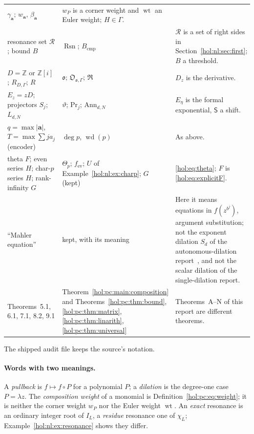 \documentclass[11pt]{article}
\numberwithin{equation}{section}
\theoremstyle{definition}
\theoremstyle{remark}
\newcommand{\Z}{\mathbb Z}
\newcommand{\abs}[1]{\lvert#1\rvert}
\newcommand{\wt}{\operatorname{wt}}
\begin{document}
{\begin{longtable}{@{}>{\raggedright\arraybackslash}p{}
>{\raggedright\arraybackslash}p{}
>{\raggedright\arraybackslash}p{}@{}}
$\gamma_{\mathbf a}$; $w_{\mathbf a}$, $\beta_{\mathbf a}$ & $w_P$ is a corner
weight and $\wt$ an Euler weight; $H\in\Gamma$.\\
resonance set $\mathcal R$; bound $B$ & $\operatorname{Rsn}$;
$B_{\mathrm{cmp}}$ & $\mathcal R$ is a set of right sides in
Section~\ref{hol:nl:sec:first}; $B$ a threshold.\\
$D=\Z$ or $\Z[i]$; $R_{D,\Gamma}$; $R$ & $\mathfrak o$; $\mathfrak O_{\mathfrak
o,\Gamma}$; $\mathfrak R$ & $D_z$ is the derivative.\\
$E_z=zD$; projectors $S_j$; $L_{d,N}$ & $\vartheta$; $\mathrm{Pr}_j$;
$\mathrm{Ann}_{d,N}$ & $E_\eta$ is the formal exponential, $\mathsf S$ a shift.\\
$q=\max\abs{\boldsymbol a}$, $T=\max\sum ja_j$ (encoder) & $\deg p$,
$\operatorname{wd}(p)$ & As above.\\
theta $F$; even series $H$; char-$p$ series $H$; rank-infinity $G$ & $\Theta_p$;
$f_{\mathrm{ev}}$; $U$ of Example~\ref{hol:nl:ex:charp}; $G$ (kept) &
\eqref{hol:eq:theta}; $F$ is \eqref{hol:eq:explicitF}.\\
``Mahler equation'' & kept, with its meaning & Here it means equations in
$f(z^{b^j})$, argument substitution; not the exponent dilation $S_d$ of the
autonomous-dilation report~\cite{repoadr}, and not the scalar dilation of the
single-dilation report.\\
Theorems~5.1, 6.1, 7.1, 8.2, 9.1 & Theorem~\ref{hol:pc:main:composition} and
Theorems~\ref{hol:pc:thm:bound}, \ref{hol:pc:thm:matrix},
\ref{hol:pc:thm:linarith}, \ref{hol:pc:thm:universal} & Theorems~A--N of this
report are different theorems.\\
\bottomrule
\end{longtable}}
The shipped audit file  keeps
the source's notation.

\paragraph{Words with two meanings.}
A \emph{pullback} is $f\mapsto f\circ P$ for a polynomial $P$; a
\emph{dilation} is the degree-one case $P=\lambda z$. The \emph{composition
weight} of a monomial is Definition~\eqref{hol:pc:eq:weight}; it is neither the
corner weight $w_P$ nor the Euler weight $\wt$. An \emph{exact} resonance is an
ordinary integer root of $I_L$, a \emph{residue} resonance one of $\chi_L$;
Example~\ref{hol:nl:ex:resonance} shows they differ.
\end{document}
